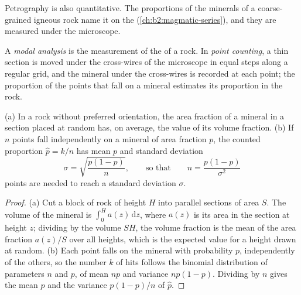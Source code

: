 Petrography is also quantitative. The proportions of the minerals of a coarse-grained igneous rock
name it on the  (\cref{ch:b2:magmatic-series}), and they are measured under the
microscope.

\begin{definition}\label{def:b2:field-lab-methods-2:modal}
A \emph{modal analysis} is the measurement of the  of a
rock. In \emph{point counting}, a thin
section is moved under the cross-wires of the microscope in equal steps along a regular grid, and
the mineral under the cross-wires is recorded at each point; the proportion of the points that
fall on a mineral estimates its proportion in the rock.
\end{definition}

\begin{proposition}\label{prop:b2:field-lab-methods-2:counting}
(a) In a rock without preferred orientation, the area fraction of a mineral in a section placed
at random has, on average, the value of its volume fraction. (b) If $n$ points fall independently
on a mineral of area fraction $p$, the counted proportion $\hat p = k/n$ has mean $p$ and standard
deviation
\begin{equation}
\sigma = \sqrt{\frac{p(1-p)}{n}} , \qquad\text{so that}\qquad n = \frac{p(1-p)}{\sigma^2}
\label{eq:b2:field-lab-methods-2:binomial}
\end{equation}
points are needed to reach a standard deviation $\sigma$.
\end{proposition}

\begin{proof}
(a) Cut a block of rock of height $H$ into parallel sections of area $S$. The volume of the
mineral is $\int_0^H a(z)\,\mathrm{d}z$, where $a(z)$ is its area in the section at height $z$;
dividing by the volume $SH$, the volume fraction is the mean of the area fraction $a(z)/S$ over
all heights, which is the expected value for a height drawn at random. (b) Each point falls on the
mineral with probability $p$, independently of the others, so the number $k$ of hits follows the
binomial distribution of parameters $n$ and $p$, of mean $np$ and variance $np(1-p)$. Dividing by
$n$ gives the mean $p$ and the variance $p(1-p)/n$ of $\hat p$.
\end{proof}

